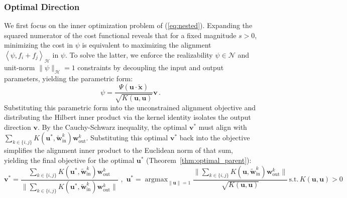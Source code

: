 \documentclass[11pt, a4paper, copyright, gdm]{google}
\newcommand{\normshort}[1]{\lVert#1\rVert}
\newcommand{\inner}[2]{\left\langle#1, #2\right\rangle}
\newcommand{\uVect}{\boldsymbol{u}}
\newcommand{\vVect}{\boldsymbol{v}}
\newcommand{\wVect}{\boldsymbol{w}}
\newcommand{\xVect}{\boldsymbol{x}}
\newcommand{\calH}{\mathcal{H}}
\newcommand{\calN}{\mathcal{N}}
\DeclareMathOperator{\argmax}{argmax}
\theoremstyle{definition}
\begin{document}
\subsubsection{Optimal Direction}
\label{sec:exact_optimal_direction}
We first focus on the inner optimization problem of (\ref{eq:nested}). Expanding the squared numerator of the cost functional reveals that for a fixed magnitude $s > 0$, minimizing the cost in $\psi$ is equivalent to maximizing the alignment $\inner{\psi}{f_i + f_j}_{\calH}$ in $\psi$. To solve the latter, we enforce the realizability $\psi \in \calN$ and unit-norm $\normshort{\psi}_{\calH} = 1$ constraints by decoupling the input and output parameters, yielding the parametric form:
\begin{equation}
\label{eq:psi_valid_exact}
\psi = \frac{\Psi(\uVect \cdot \tilde{\xVect})}{\sqrt{K(\uVect,\uVect)}} \vVect \,.
\end{equation}
Substituting this parametric form into the unconstrained alignment objective and distributing the Hilbert inner product via the kernel identity isolates the output direction $\vVect$. By the Cauchy-Schwarz inequality, the optimal $\vVect^*$ must align with $\sum_{k \in \{i,j\}} K(\uVect^*, \tilde{\wVect}^k_{\text{in}}) \wVect^k_{\text{out}}$. Substituting this optimal $\vVect^*$ back into the objective simplifies the alignment inner product to the Euclidean norm of that sum, yielding the final objective for the optimal $\uVect^*$ (Theorem~\ref{thm:optimal_parent}):
\begin{equation}
\label{eq:opt_u_exact_main}
\vVect^* = \frac{\sum_{k \in \{i,j\}} K(\uVect^*, \tilde{\wVect}^k_{\text{in}}) \wVect^k_{\text{out}}}{\normshort{\sum_{k \in \{i,j\}} K(\uVect^*, \tilde{\wVect}^k_{\text{in}}) \wVect^k_{\text{out}}}} \,\,,\,\, \uVect^* = \argmax_{\normshort{\uVect}=1} \frac{\normshort{\sum_{k \in \{i,j\}} K(\uVect, \tilde{\wVect}^k_{\text{in}}) \wVect^k_{\text{out}}}}{\sqrt{K(\uVect,\uVect)}} \, \mbox{s.t.} \, K(\uVect, \uVect) > 0
\end{equation}
\end{document}
